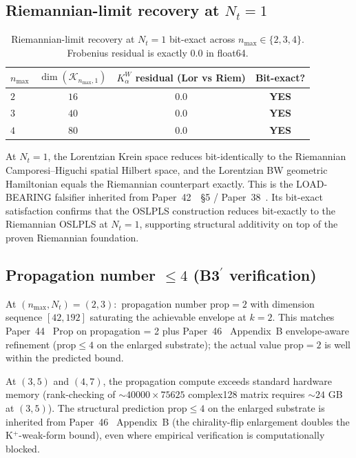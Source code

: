 \documentclass[11pt,a4paper]{article}
\theoremstyle{plain}
\theoremstyle{definition}
\newcommand{\nmax}{n_{\max}}
\newcommand{\Nt}{N_{t}}
\newcommand{\Krein}{\mathcal{K}}
\newcommand{\Kalpha}{K_{\alpha}^{W}}
\begin{document}
\subsection{Riemannian-limit recovery at $\Nt=1$}
\label{sec:riemannian_limit_panel}

\begin{table}[h]
\centering
\begin{tabular}{lccc}
\toprule
$\nmax$ & $\dim(\Krein_{\nmax,1})$ & $\Kalpha$ residual (Lor vs Riem) & Bit-exact? \\
\midrule
$2$ & $16$ & $0.0$ & \textbf{YES} \\
$3$ & $40$ & $0.0$ & \textbf{YES} \\
$4$ & $80$ & $0.0$ & \textbf{YES} \\
\bottomrule
\end{tabular}
\caption{Riemannian-limit recovery at $\Nt=1$ bit-exact across
$\nmax\in\{2,3,4\}$. Frobenius residual is exactly $0.0$ in float64.}
\label{tab:riemannian_limit_panel}
\end{table}

At $\Nt=1$, the Lorentzian Krein space reduces bit-identically to the
Riemannian Camporesi--Higuchi spatial Hilbert space, and the Lorentzian
BW geometric Hamiltonian equals the Riemannian counterpart exactly.
This is the LOAD-BEARING falsifier inherited from
Paper~42~\cite{paper42}~\S 5 / Paper~38~\cite{paper38}. Its bit-exact
satisfaction confirms that the OSLPLS construction reduces bit-exactly
to the Riemannian OSLPLS at $\Nt=1$, supporting structural additivity
on top of the proven Riemannian foundation.

\subsection{Propagation number $\le 4$ (B3$^{\prime}$ verification)}
\label{sec:propagation_panel}

At $(\nmax,\Nt)=(2,3)$:\ propagation number $\mathrm{prop}=2$ with
dimension sequence $[42,192]$ saturating the achievable envelope at
$k=2$. This matches Paper~44~\cite{paper44} Prop on propagation = 2
plus Paper~46~\cite{paper46} Appendix~B envelope-aware refinement
($\mathrm{prop}\le 4$ on the enlarged substrate); the actual value
$\mathrm{prop}=2$ is well within the predicted bound.

At $(3,5)$ and $(4,7)$, the propagation compute exceeds standard
hardware memory (rank-checking of $\sim 40000\times 75625$ complex128
matrix requires $\sim 24$ GB at $(3,5)$). The structural prediction
$\mathrm{prop}\le 4$ on the enlarged substrate is inherited from
Paper~46~\cite{paper46} Appendix~B (the chirality-flip enlargement
doubles the K$^{+}$-weak-form bound), even where empirical
verification is computationally blocked.
\end{document}

